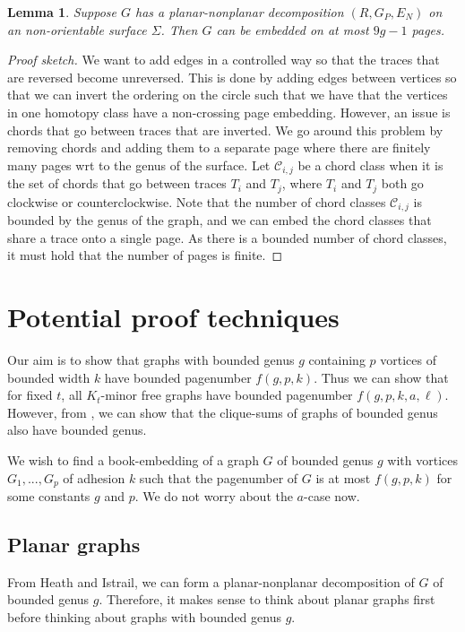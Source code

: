 \documentclass[]{report}
\newtheorem{lemma}[theorem]{Lemma}
\theoremstyle{definition}
\numberwithin{theorem}{section}
\numberwithin{equation}{section}
\begin{document}
\begin{lemma}\label{lem:planar_nonplanar_nonorientable}
	Suppose $G$ has a planar-nonplanar decomposition $(R, G_P, E_N)$ on an non-orientable surface $\Sigma$. Then $G$ can be embedded on at most $9g - 1$ pages.
\end{lemma}
\begin{proof}[Proof sketch]
We want to add edges in a controlled way so that the traces that are reversed become unreversed. This is done by adding edges between vertices so that we can invert the ordering on the circle such that we have that the vertices in one homotopy class have a non-crossing page embedding. However, an issue is chords that go between traces that are inverted. We go around this problem by removing chords and adding them to a separate page where there are finitely many pages wrt to the genus of the surface. Let $\mathcal{C}_{i,j}$ be a chord class when it is the set of chords that go between traces $T_i$ and $T_j$, where $T_i$ and $T_j$ both go clockwise or counterclockwise. Note that the number of chord classes $\mathcal{C}_{i,j}$ is bounded by the genus of the graph, and we can embed the chord classes that share a trace onto a single page. As there is a bounded number of chord classes, it must hold that the number of pages is finite. 
\end{proof}

\chapter{Potential proof techniques}\label{chap:Proving_The_Theorem}
Our aim is to show that graphs with bounded genus $g$ containing $p$ vortices of bounded width $k$ have bounded pagenumber $f(g, p, k)$. Thus we can show that for fixed $t$, all $K_t$-minor free graphs have bounded pagenumber $f(g, p, k, a, \ell)$. However, from \cite{hickingbothamStackNumberCliqueSum2023}, we can show that the clique-sums of graphs of bounded genus also have bounded genus.

We wish to find a book-embedding of a graph $G$ of bounded genus $g$ with vortices $G_1, ..., G_p$ of adhesion $k$ such that the pagenumber of $G$ is at most $f(g, p, k)$ for some constants $g$ and $p$. We do not worry about the $a$-case now.

\section{Planar graphs}
From Heath and Istrail, we can form a planar-nonplanar decomposition of $G$ of bounded genus $g$. Therefore, it makes sense to think about planar graphs first before thinking about graphs with bounded genus $g$.
\end{document}
